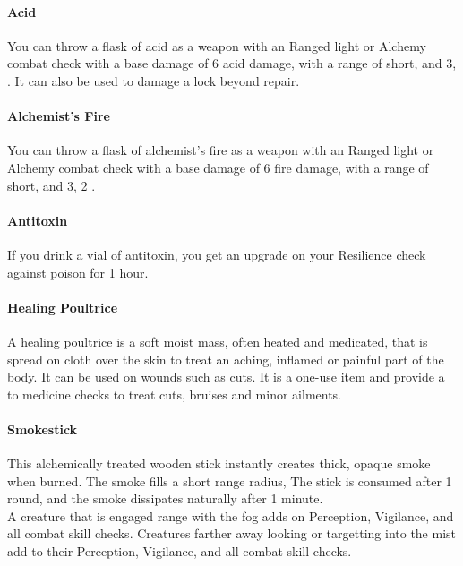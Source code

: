\begin{multicols}{2}

\paragraph{Acid} \label{alcitm:acid}
You can throw a flask of acid as a weapon with an
Ranged light or Alchemy combat check with a base
damage of 6 acid damage, with a range of short, and
 3, .
It can also be used to damage a lock beyond repair.

\paragraph{Alchemist's Fire} \label{alcitm:alchemistsfire}
You can throw a flask of alchemist’s fire as a weapon
with an Ranged light or Alchemy combat check with
a base damage of 6 fire damage, with a range of short,
and  3,  2 .

\paragraph{Antitoxin} \label{alcitm:antitoxin}
If you drink a vial of antitoxin, you get an upgrade on
your Resilience check against poison for 1 hour.

\paragraph{Healing Poultrice} \label{alcitm:healingpoultrice}
A healing poultrice is a soft moist mass, often heated and
medicated, that is spread on cloth over the skin to treat an
aching, inflamed or painful part of the body. It can be used
on wounds such as cuts. It is a one-use item and provide a \boost
to medicine checks to treat cuts, bruises and minor ailments.

\paragraph{Smokestick} \label{alcitm:smokestick}
This alchemically treated wooden stick instantly creates
thick, opaque smoke when burned. The smoke fills a
short range radius, The stick is consumed after 1 round,
and the smoke dissipates naturally after 1 minute.\\
A creature that is engaged range with the fog adds
\setback on Perception, Vigilance, and all combat skill
checks. Creatures farther away looking or targetting into
the mist add \setback\setback to their Perception, Vigilance,
and all combat skill checks.


\end{multicols}
